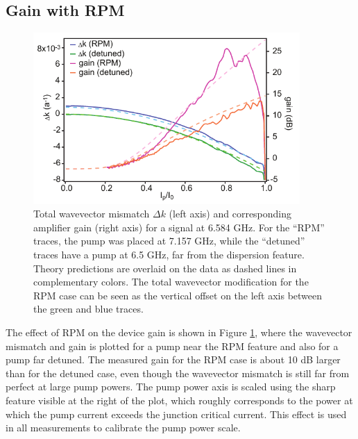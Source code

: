\subsection{Gain with RPM}\label{s:gain_with_rpm}

\begin{figure}
\begin{center}
\includegraphics[width=4in]{twpa_exp/gain_and_dk}
\end{center}
\caption[Gain and phase mismatch comparison]{Total wavevector mismatch $\Delta k$ (left axis) and corresponding amplifier gain (right axis) for a signal at 6.584 GHz.  For the ``RPM'' traces, the pump was placed at 7.157 GHz, while the ``detuned'' traces have a pump at 6.5 GHz, far from the dispersion feature.  Theory predictions are overlaid on the data as dashed lines in complementary colors.  The total wavevector modification for the RPM case can be seen as the vertical offset on the left axis between the green and blue traces.}
\label{fig:gain_and_dk}
\end{figure}

The effect of RPM on the device gain is shown in Figure \ref{fig:gain_and_dk}, where the wavevector mismatch and gain is plotted for a pump near the RPM feature and also for a pump far detuned.  The measured gain for the RPM case is about 10 dB larger than for the detuned case, even though the wavevector mismatch is still far from perfect at large pump powers.  The pump power axis is scaled using the sharp feature visible at the right of the plot, which roughly corresponds to the power at which the pump current exceeds the junction critical current.  This effect is used in all measurements to calibrate the pump power scale.

